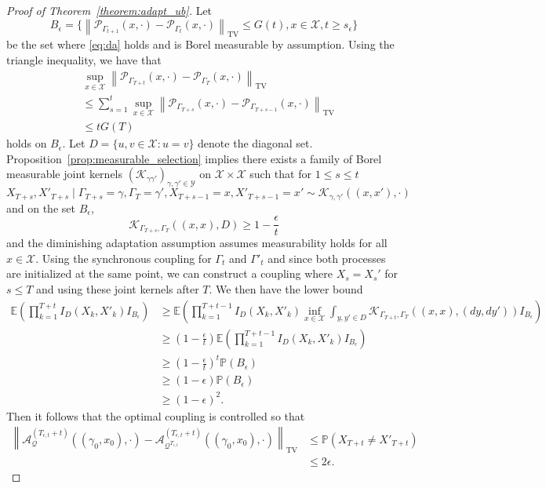 \documentclass[12pt]{article}
\theoremstyle{plain}
\theoremstyle{remark}
\newcommand{\norm}[1]{\left\lVert#1\right\rVert}
\newcommand{\e}{\epsilon}
\newcommand{\Q}{\mathcal{Q}}
\newcommand{\E}{\mathbb{E}}
\newcommand{\Prob}{\mathbb{P}}
\renewcommand{\P}{\mathcal{P}}
\newcommand{\A}{\mathcal{A}}
\newcommand{\K}{\mathcal{K}}
\newcommand{\X}{\mathcal{X}}
\newcommand{\Y}{\mathcal{Y}}
\begin{document}
\begin{proof}[Proof of Theorem~\ref{theorem:adapt_ub}]
Let 
\[
B_{\e} = \{ \norm{\P_{\Gamma_{t + 1}}(x, \cdot) - \P_{\Gamma_t}(x, \cdot)}_{\text{TV}} \le G(t), x \in \X, t \ge s_{\e} \}
\] 
be the set where \eqref{eq:da} holds and is Borel measurable by assumption.
Using the triangle inequality, we have that
\begin{align*}
&\sup_{x \in \X}\norm{\P_{\Gamma_{T + t}}(x, \cdot) - \P_{\Gamma_{T}}(x, \cdot)}_{\text{TV}}
\\
&\le \sum_{s = 1}^{t} \sup_{x \in \X}\norm{\P_{\Gamma_{T + s}}(x, \cdot) - \P_{\Gamma_{T + s - 1}}(x, \cdot)}_{\text{TV}}
\\
&\le t G(T)
\end{align*}
holds on $B_{\e}$.
Let $D = \{ u, v \in \X : u = v \}$ denote the diagonal set.
Proposition~\ref{prop:measurable_selection} implies there exists a family of Borel measurable joint kernels $(\K_{\gamma \gamma'} )_{\gamma, \gamma' \in \Y}$ on $\X \times \X$ such that for $1 \le s \le t$
\[
X_{T + s}, X'_{T + s} \mid \Gamma_{T + s} = \gamma, \Gamma_{T} = \gamma', X_{T + s - 1} = x, X'_{T + s - 1} = x' \sim \K_{\gamma, \gamma'}((x, x'), \cdot)
\]
and on the set $B_{\e}$,
\[
\K_{\Gamma_{T + s}, \Gamma_{T}}((x, x), D)
\ge 1 - \frac{\e}{t}
\]
and the diminishing adaptation assumption assumes measurability holds for all $x \in \X$.
Using the synchronous coupling for $\Gamma_t$ and $\Gamma'_t$ and since both processes are initialized at the same point, we can construct a coupling where $X_{s} = X_{s}'$ for $s \le T$ and using these joint kernels after $T$.
We then have the lower bound
\begin{align*}
\E\left( \prod_{k = 1}^{T + t} I_D(X_{k}, X'_{k}) I_{B_{\e}} \right)
&\ge \E\left( \prod_{k = 1}^{T + t - 1} I_D(X_{k}, X'_{k}) 
\inf_{x \in \X} \int_{y, y' \in D} \K_{\Gamma_{T + t}, \Gamma_{T}}((x, x), (dy, dy')) I_{B_{\e}} \right) 
\\
&\ge \left( 1 - \frac{\e}{t} \right) \E\left( \prod_{k = 1}^{T + t - 1} I_D(X_{k}, X'_{k}) I_{B_{\e}} \right)
\\
&\ge \left( 1 - \frac{\e}{t} \right)^t \Prob(B_{\e})
\\
&\ge \left( 1 - \e \right) \Prob(B_{\e})
\\
&\ge \left( 1 - \e \right)^2.
\end{align*}
Then it follows that the optimal coupling is controlled so that
\begin{align*}
\norm{ \A_{\Q}^{(T_{\e, t} + t)}((\gamma_0, x_0), \cdot) - \A_{\Q^{T_{\e, t}}}^{(T_{\e, t} + t)}((\gamma_0, x_0), \cdot) }_{\text{TV}}
&\le 
\Prob\left( X_{T + t} \not= X'_{T + t} \right)
\\
&\le 2 \e.
\end{align*}


\end{proof}
\end{document}
